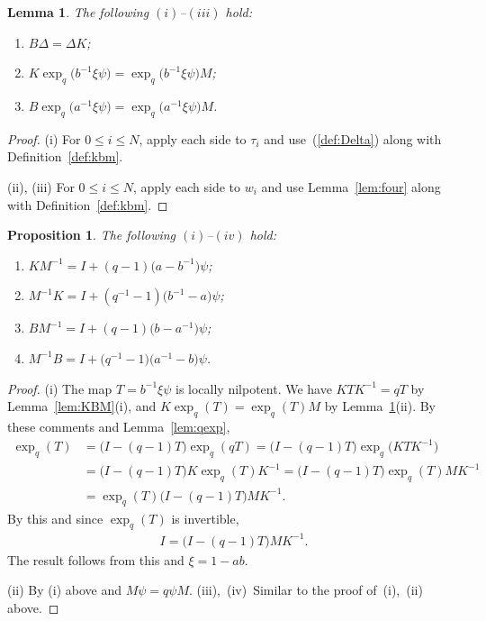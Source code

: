 \documentclass[pdftex]{sigma}
\numberwithin{equation}{section}
\newtheorem{Lemma}[Theorem]{Lemma}
\newtheorem{Proposition}[Theorem]{Proposition}
\begin{document}
\begin{Lemma}\label{lem:BDDK}
The following $(i)$--$(iii)$ hold:
\begin{enumerate}\itemsep=0pt
\item[$(i)$]
$B \Delta = \Delta K$;
\item[$(ii)$]
$K \exp_q \big(b^{-1}\xi \psi\big) =
 \exp_q \big(b^{-1}\xi \psi\big) M$;
\item[$(iii)$]
$B\exp_q \big(a^{-1}\xi \psi\big) =
 \exp_q \big(a^{-1}\xi \psi\big) M$.
\end{enumerate}
\end{Lemma}
\begin{proof}(i) For $0 \leq i \leq N$,
apply each side to $\tau_i$ and use~(\ref{def:Delta}) along with Definition~\ref{def:kbm}.

(ii), (iii) For $0 \leq i \leq N$,
apply each side to $w_i$
and use Lemma~\ref{lem:four} along with Definition~\ref{def:kbm}.
\end{proof}

\begin{Proposition}\label{prop:MKB}
The following $(i)$--$(iv)$ hold:
\begin{enumerate}\itemsep=0pt
\item[$(i)$] $KM^{-1} = I + (q-1)\big(a-b^{-1}\big) \psi$;
\item[$(ii)$] $M^{-1}K = I + (q^{-1}-1)\big(b^{-1}-a\big) \psi$;
\item[$(iii)$] $BM^{-1} = I + (q-1)\big(b-a^{-1}\big) \psi$;
\item[$(iv)$] $M^{-1}B = I + \big(q^{-1}-1\big)\big(a^{-1}-b\big) \psi$.
\end{enumerate}
\end{Proposition}
\begin{proof} (i)
 The map $T= b^{-1} \xi \psi$ is locally nilpotent.
We have
 $K T K^{-1} = qT$ by
 Lemma~\ref{lem:KBM}(i),
and $K \exp_q(T) = \exp_q(T) M$ by
Lemma~\ref{lem:BDDK}(ii).
By these comments and
 Lemma~\ref{lem:qexp},
\begin{align*}
\exp_q( T)&= \big(I - (q-1)T\big) \exp_q(qT)
= \big(I - (q-1)T\big) \exp_q\big(KTK^{-1}\big)
\\
&= \big(I - (q-1)T\big) K \exp_q(T)K^{-1}
= \bigl(I - (q-1)T\bigr) \exp_q(T)M K^{-1}
\\
&= \exp_q(T) \big(I - (q-1)T\big) M K^{-1}.
\end{align*}
By this and since $\exp_q( T)$ is invertible,
\begin{gather*}
I= \bigl(I - (q-1)T\bigr) M K^{-1}.
\end{gather*}
The result follows from this and $\xi = 1-ab$.

(ii) By (i) above and $ M \psi = q \psi M$.
(iii),~(iv)~Similar to the proof of~(i),~(ii) above.
\end{proof}
\end{document}
